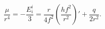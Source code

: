 \begin{equation}
\frac{\mu}{r^4}=-\frac{E^i_i}{3}=\frac{r}{4f^2}\left(\frac{h f^2}{r^2}\right)'+\frac{q}{2r^2}.
\end{equation}

